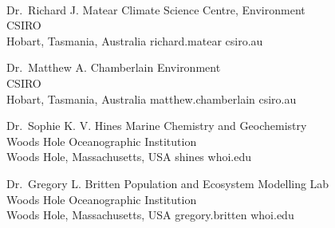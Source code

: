 {%

    ~

     \label{RM}
    \cvreference
        {Dr.~Richard J. Matear}
        {Climate Science Centre, Environment\\
        CSIRO\\
        Hobart, Tasmania, Australia}
        {richard.matear}
        {csiro.au}

     \label{MC}
    \cvreference
        {Dr.~Matthew A. Chamberlain}
        {Environment\\
        CSIRO\\
        Hobart, Tasmania, Australia}
        {matthew.chamberlain}
        {csiro.au}

     \label{SH}
    \cvreference
        {Dr.~Sophie K. V. Hines}
        {Marine Chemistry and Geochemistry\\
        Woods Hole Oceanographic Institution\\
        Woods Hole, Massachusetts, USA}
        {shines}
        {whoi.edu}

     \label{GB}
    \cvreference
        {Dr.~Gregory L. Britten}
        {Population and Ecosystem Modelling Lab\\
        Woods Hole Oceanographic Institution\\
        Woods Hole, Massachusetts, USA}
        {gregory.britten}
        {whoi.edu}
}
\vspace{10pt}


